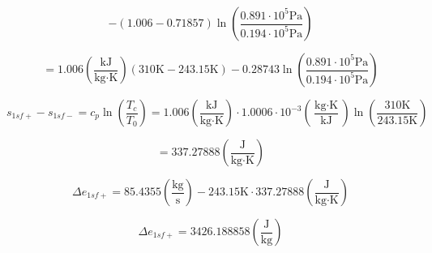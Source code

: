 \[
- \left( 1.006 - 0.71857 \right) \ln \left( \frac{0.891 \cdot 10^5 \text{Pa}}{0.194 \cdot 10^5 \text{Pa}} \right)
\]

\[
= 1.006 \left( \frac{\text{kJ}}{\text{kg} \cdot \text{K}} \right) \left( 310 \text{K} - 243.15 \text{K} \right) - 0.28743 \ln \left( \frac{0.891 \cdot 10^5 \text{Pa}}{0.194 \cdot 10^5 \text{Pa}} \right)
\]

\[
s_{1sf+} - s_{1sf-} = c_p \ln \left( \frac{T_c}{T_0} \right) = 1.006 \left( \frac{\text{kJ}}{\text{kg} \cdot \text{K}} \right) \cdot 1.0006 \cdot 10^{-3} \left( \frac{\text{kg} \cdot \text{K}}{\text{kJ}} \right) \ln \left( \frac{310 \text{K}}{243.15 \text{K}} \right)
\]

\[
= 337.27888 \left( \frac{\text{J}}{\text{kg} \cdot \text{K}} \right)
\]

\[
\Delta e_{1sf+} = 85.4355 \left( \frac{\text{kg}}{\text{s}} \right) - 243.15 \text{K} \cdot 337.27888 \left( \frac{\text{J}}{\text{kg} \cdot \text{K}} \right)
\]

\[
\Delta e_{1sf+} = 3426.188858 \left( \frac{\text{J}}{\text{kg}} \right)
\]